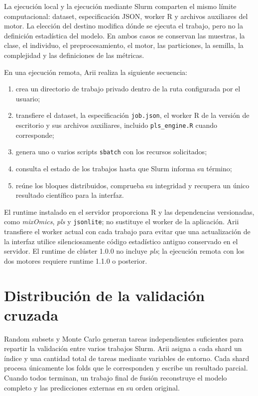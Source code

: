 \documentclass[11pt,a4paper,openany]{report}
\newcommand{\mixOmics}{\textit{mixOmics}}
\newcommand{\plsPkg}{\textit{pls}}
\newcommand{\code}[1]{\texttt{#1}}
\begin{document}
La ejecución local y la ejecución mediante Slurm comparten el mismo límite computacional: dataset, especificación JSON, worker R y archivos auxiliares del motor. La elección del destino modifica dónde se ejecuta el trabajo, pero no la definición estadística del modelo. En ambos casos se conservan las muestras, la clase, el individuo, el preprocesamiento, el motor, las particiones, la semilla, la complejidad y las definiciones de las métricas.

En una ejecución remota, Arii realiza la siguiente secuencia:
\begin{enumerate}[leftmargin=*]
  \item crea un directorio de trabajo privado dentro de la ruta configurada por el usuario;
  \item transfiere el dataset, la especificación \code{job.json}, el worker R de la versión de escritorio y sus archivos auxiliares, incluido \code{pls\_engine.R} cuando corresponde;
  \item genera uno o varios scripts \code{sbatch} con los recursos solicitados;
  \item consulta el estado de los trabajos hasta que Slurm informa su término;
  \item reúne los bloques distribuidos, comprueba su integridad y recupera un único resultado científico para la interfaz.
\end{enumerate}

El runtime instalado en el servidor proporciona R y las dependencias versionadas, como \mixOmics, \plsPkg{} y \code{jsonlite}; no sustituye el worker de la aplicación. Arii transfiere el worker actual con cada trabajo para evitar que una actualización de la interfaz utilice silenciosamente código estadístico antiguo conservado en el servidor. El runtime de clúster 1.0.0 no incluye \plsPkg; la ejecución remota con los dos motores requiere runtime 1.1.0 o posterior.

\section{Distribución de la validación cruzada}

Random subsets y Monte Carlo generan tareas independientes suficientes para repartir la validación entre varios trabajos Slurm. Arii asigna a cada shard un índice y una cantidad total de tareas mediante variables de entorno. Cada shard procesa únicamente los folds que le corresponden y escribe un resultado parcial.
Cuando todos terminan, un trabajo final de fusión reconstruye el modelo completo y las predicciones externas en su orden original.
\end{document}
